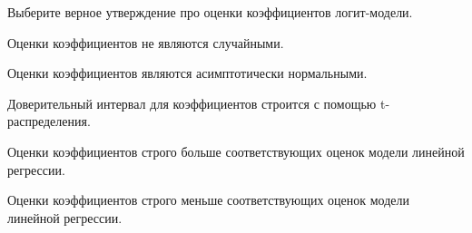 
\begin{question}
Выберите верное утверждение про оценки коэффициентов логит-модели.
\begin{answerlist}
  \item Оценки коэффициентов не являются случайными.
  \item Оценки коэффициентов являются асимптотически нормальными.
  \item Доверительный интервал для коэффициентов строится с помощью t-распределения.
  \item Оценки коэффициентов строго больше соответствующих оценок модели линейной регрессии.
  \item Оценки коэффициентов строго меньше соответствующих оценок модели линейной регрессии.
\end{answerlist}
\end{question}



